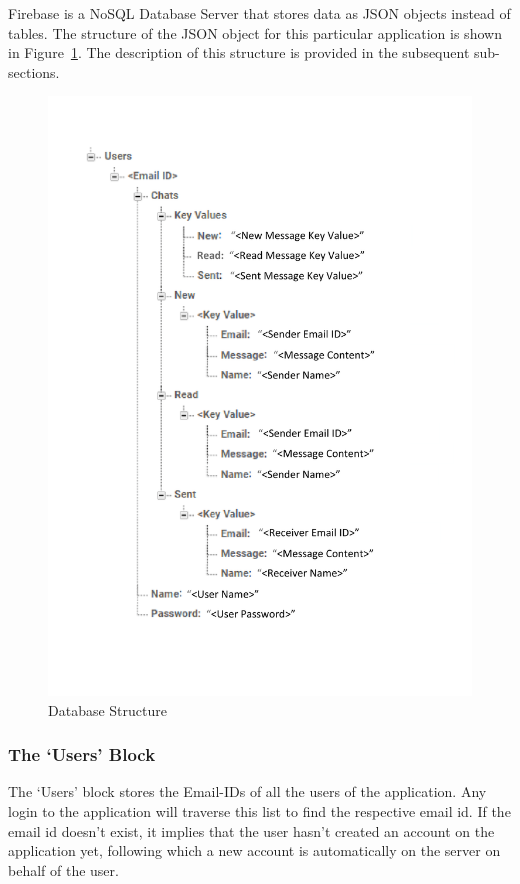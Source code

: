 \documentclass[14pt]{report}
\begin{document}
				Firebase is a NoSQL Database Server that stores data as JSON objects instead of tables. The structure of the JSON object for this particular application is shown in Figure~\ref{fig:DataStruct}. The description of this structure is provided in the subsequent sub-sections.\\
				\begin{figure}[H]
					\includegraphics[width=15cm]{DataStruct.png}
					\centering
					\caption{Database Structure}
					\label{fig:DataStruct}
				\end{figure} 
				\subsubsection{The `Users' Block}
					The `Users' block stores the Email-IDs of all the users of the application. Any login to the application will traverse this list to find the respective email id. If the email id doesn't exist, it implies that the user hasn't created an account on the application yet, following which a new account is automatically on the server on behalf of the user.\\
\end{document}
